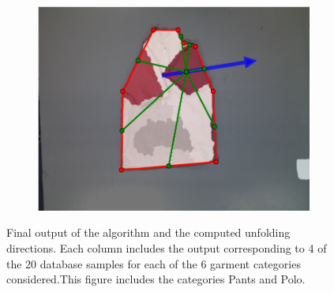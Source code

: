 \begin{figure}[htbp]
\begin{subfigure}[r]{\bigtablewidth}
    	\includegraphics[width=\textwidth]
    	{figures/results/polo15-pnp.pdf}
	\end{subfigure}
	\caption[Final output of the algorithm and the computed unfolding directions (Pants and Polo).]
    {Final output of the algorithm and the computed unfolding directions. Each column includes the output corresponding to 4 of the 20 database samples for each of the 6 garment categories considered.This figure includes the categories Pants and Polo.}
    \label{fig:results2}
\end{figure}

